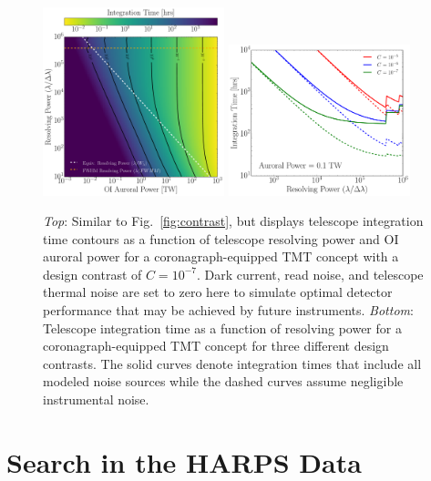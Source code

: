 \documentclass{emulateapj}
\begin{document}
\begin{figure}
\centering
\includegraphics[width=0.47\textwidth]{exptime_B_inline_TMTC-7_noInstrumental.pdf}
\includegraphics[width=0.47\textwidth]{steadystate_contrast.pdf}
\caption{\textit{Top}: Similar to Fig.~\ref{fig:contrast}, but displays telescope integration time contours as a function of telescope resolving power and OI auroral power for a coronagraph-equipped TMT concept with a design contrast of $C = 10^{-7}$. Dark current, read noise, and telescope thermal noise are set to zero here to simulate optimal detector performance that may be achieved by future instruments. \textit{Bottom}: Telescope integration time as a function of resolving power for a coronagraph-equipped TMT concept for three different design contrasts.  The solid curves denote integration times that include all modeled noise sources while the dashed curves assume negligible instrumental noise.}
\label{fig:TMTC}
\end{figure}

\section{Search in the HARPS Data}
\label{sec:search}
\end{document}
